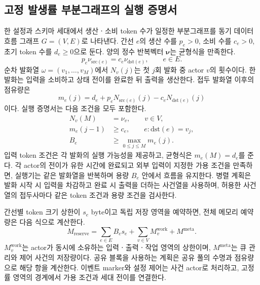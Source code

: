 \subsection{고정 발생률 부분그래프의 실행 증명서}

한 설정과 스키마 세대에서 생산ㆍ소비 token 수가 일정한 부분그래프를
동기 데이터흐름 그래프 $G=(V,E)$로 나타낸다\citep{sdf}.
간선 $e$의 생산 수를 $p_e>0$, 소비 수를 $c_e>0$,
초기 token 수를 $d_e\ge0$으로 둔다.
양의 정수 반복벡터 $\boldsymbol\nu$는 균형식을 만족한다.
\begin{equation}
 p_e\nu_{\mathrm{src}(e)}
 =
 c_e\nu_{\mathrm{dst}(e)},
 \qquad e\in E.
 \label{eq:sdf-balance}
\end{equation}
순차 발화열 $\omega=(v_1,\ldots,v_M)$에서 $N_v(j)$는
첫 $j$회 발화 중 actor $v$의 횟수이다.
한 발화는 입력을 소비하고 상태 전이를 완료한 뒤 출력을 생산한다.
접두 발화열 이후의 점유량은
\begin{equation}
 m_e(j)=d_e+p_eN_{\mathrm{src}(e)}(j)
                 -c_eN_{\mathrm{dst}(e)}(j)
 \label{eq:sdf-occupancy}
\end{equation}
이다. 실행 증명서는 다음 조건을 모두 포함한다.
\begin{equation}
 \begin{aligned}
 N_v(M)&=\nu_v,\qquad v\in V,\\
 m_e(j-1)&\ge c_e,
       \qquad e:\mathrm{dst}(e)=v_j,\\
 B_e&\ge\max_{0\le j\le M}m_e(j).
 \end{aligned}
 \label{eq:sdf-certificate}
\end{equation}
입력 token 조건은 각 발화의 실행 가능성을 제공하고,
균형식은 $m_e(M)=d_e$를 준다.
각 actor의 전이가 유한 시간에 완료되고 외부 입력이 지정한 가용 조건을 만족하면,
실행기는 같은 발화열을 반복하며 용량 $B_e$ 안에서 흐름을 유지한다.
병렬 계획은 발화 시작 시 입력을 차감하고 완료 시 출력을 더하는 사건열을 사용하며,
허용한 사건열의 접두사마다 같은 token 조건과 용량 조건을 검사한다.

간선별 token 크기 상한이 $s_e$ byte이고 독립 저장 영역을 예약하면,
전체 메모리 예약량은 다음 식으로 계산한다.
\begin{equation}
 M_{\mathrm{reserve}}
 =
 \sum_{e\in E}B_es_e+
 \sum_{v\in V}M_v^{\mathrm{work}}+
 M^{\mathrm{meta}}.
 \label{eq:memory-reservation}
\end{equation}
$M_v^{\mathrm{work}}$는 actor가 동시에 소유하는 입력ㆍ출력ㆍ작업 영역의 상한이며,
$M^{\mathrm{meta}}$는 큐 관리와 제어 사건의 저장량이다.
공유 블록을 사용하는 계획은 공유 풀의 수명과 점유량으로 해당 항을 계산한다.
이벤트 marker와 설정 제어는 사건 actor로 처리하고,
고정률 영역의 경계에서 가용 조건과 세대 전이를 연결한다.

